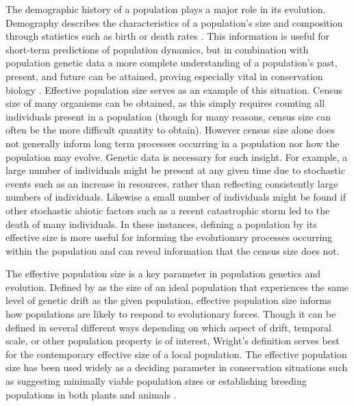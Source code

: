 The demographic history of a population plays a major role in its evolution. Demography describes the characteristics of a population's size and composition through statistics such as birth or death rates \citep{Pavlik:2000}. This information is useful for short-term predictions of population dynamics, but in combination with population genetic data a more complete understanding of a population's past, present, and future can be attained, proving especially vital in conservation biology \citep{Lande:1988, Avise:1995, Nunney:1993}. Effective population size serves as an example of this situation. Census size of many organisms can be obtained, as this simply requires counting all individuals present in a population (though for many reasons, census size can often be the more difficult quantity to obtain). However census size alone does not generally inform long term processes occurring in a population nor how the population may evolve. Genetic data is necessary for such insight. For example, a large number of individuals might be present at any given time due to stochastic events such as an increase in resources, rather than reflecting consistently large numbers of individuals. Likewise a small number of individuals might be found if other stochastic abiotic factors such as a recent catastrophic storm led to the death of many individuals. In these instances, defining a population by its effective size is more useful for informing the evolutionary processes occurring within the population and can reveal information that the census size does not. 

The effective population size is a key parameter in population genetics and evolution. Defined by \citet{Wright:1931} as the size of an ideal population that experiences the same level of genetic drift as the given population, effective population size informs how populations are likely to respond to evolutionary forces. Though it can be defined in several different ways depending on which aspect of drift, temporal scale, or other population property is of interest, Wright's definition serves best for the contemporary effective size of a local population. The effective population size has been used widely as a deciding parameter in conservation situations such as suggesting minimally viable population sizes or establishing breeding populations in both plants and animals \citep{Lande:1987, Soule:1987, Ellstrand:1993}.

